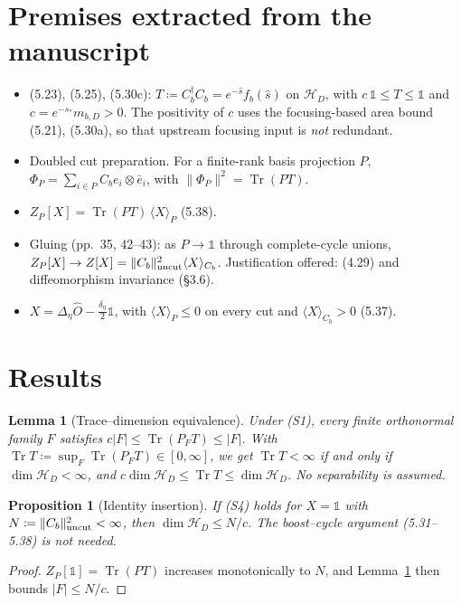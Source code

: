 \documentclass[11pt]{article}
\newtheorem{lemma}{Lemma}
\newtheorem{proposition}{Proposition}
\theoremstyle{remark}
\newcommand{\Tr}{\operatorname{Tr}}
\newcommand{\HD}{\mathcal H_D}
\newcommand{\one}{\mathbb 1}
\begin{document}
\section{Premises extracted from the manuscript}
\begin{itemize}
  \item[(S1)] (5.23), (5.25), (5.30c): $T\coloneqq C_b^\dagger C_b=e^{-\hat s}f_b(\hat s)$
  on $\HD$, with $c\,\one\le T\le\one$ and $c=e^{-s_*}m_{b,D}>0$. The positivity of
  $c$ uses the focusing-based area bound (5.21), (5.30a), so that upstream focusing input
  is \emph{not} redundant.
  \item[(S2)] Doubled cut preparation. For a finite-rank basis projection $P$,
  $\Phi_P=\sum_{i\in P}C_b e_i\otimes\bar e_i$, with $\|\Phi_P\|^2=\Tr(PT)$.
  \item[(S3)] $Z_P[X]=\Tr(PT)\,\langle X\rangle_P$ (5.38).
  \item[(S4)] Gluing (pp.~35, 42--43): as $P\to\one$ through complete-cycle unions,
  $Z_P[X]\to Z[X]=\|C_b\|^2_{\rm uncut}\langle X\rangle_{C_b}$. Justification offered:
  (4.29) and diffeomorphism invariance (\S3.6).
  \item[(S5)] $X=\Delta_\eta\hat O-\tfrac{\delta_\eta}{2}\one$, with
  $\langle X\rangle_P\le0$ on every cut and $\langle X\rangle_{C_b}>0$ (5.37).
\end{itemize}

\section{Results}
\begin{lemma}[Trace--dimension equivalence]\label{lem:equiv}
Under (S1), every finite orthonormal family $F$ satisfies $c|F|\le\Tr(P_FT)\le|F|$.
With $\Tr T\coloneqq\sup_F\Tr(P_FT)\in[0,\infty]$, we get $\Tr T<\infty$ if and only if
$\dim\HD<\infty$, and $c\dim\HD\le\Tr T\le\dim\HD$. No separability is assumed.
\end{lemma}

\begin{proposition}[Identity insertion]\label{prop:one}
If (S4) holds for $X=\one$ with $N\coloneqq\|C_b\|^2_{\rm uncut}<\infty$, then
$\dim\HD\le N/c$. The boost--cycle argument (5.31--5.38) is not needed.
\end{proposition}
\begin{proof}
$Z_P[\one]=\Tr(PT)$ increases monotonically to $N$, and Lemma~\ref{lem:equiv} then
bounds $|F|\le N/c$.
\end{proof}
\end{document}
